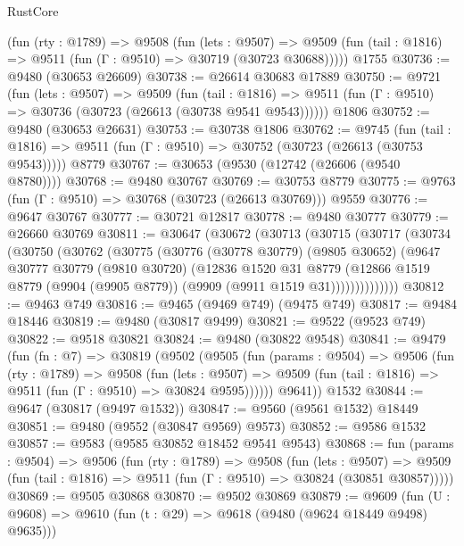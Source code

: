 \begin{lexlean}{RustCore}
\begin{coremodule}
    (fun (rty : @1789) =>
    @9508
      (fun (lets : @9507) =>
      @9509 (fun (tail : @1816) => @9511 (fun (Γ : @9510) => @30719 (@30723 @30688)))))
    @1755
@30736 := @9480 (@30653 @26609)
@30738 := @26614 @30683 @17889
@30750 := @9721
    (fun (lets : @9507) =>
    @9509
      (fun (tail : @1816) =>
      @9511 (fun (Γ : @9510) => @30736 (@30723 (@26613 (@30738 @9541 @9543))))))
    @1806
@30752 := @9480 (@30653 @26631)
@30753 := @30738 @1806
@30762 := @9745
    (fun (tail : @1816) => @9511 (fun (Γ : @9510) => @30752 (@30723 (@26613 (@30753 @9543)))))
    @8779
@30767 := @30653 (@9530 (@12742 (@26606 (@9540 @8780))))
@30768 := @9480 @30767
@30769 := @30753 @8779
@30775 := @9763 (fun (Γ : @9510) => @30768 (@30723 (@26613 @30769))) @9559
@30776 := @9647 @30767
@30777 := @30721 @12817
@30778 := @9480 @30777
@30779 := @26660 @30769
@30811 := @30647
    (@30672
      (@30713
        (@30715
          (@30717
            (@30734
              (@30750
                (@30762
                  (@30775
                    (@30776
                      (@30778 @30779)
                      (@9805 @30652)
                      (@9647
                        @30777
                        @30779
                        (@9810 @30720)
                        (@12836
                          @1520
                          @31
                          @8779
                          (@12866
                            @1519
                            @8779
                            (@9904 (@9905 @8779))
                            (@9909 (@9911 @1519 @31))))))))))))))
@30812 := @9463 @749
@30816 := @9465 (@9469 @749) (@9475 @749)
@30817 := @9484 @18446
@30819 := @9480 (@30817 @9499)
@30821 := @9522 (@9523 @749)
@30822 := @9518 @30821
@30824 := @9480 (@30822 @9548)
@30841 := @9479
    (fun (fn : @7) =>
    @30819
      (@9502
        (@9505
          (fun (params : @9504) =>
          @9506
            (fun (rty : @1789) =>
            @9508
              (fun (lets : @9507) =>
              @9509 (fun (tail : @1816) => @9511 (fun (Γ : @9510) => @30824 @9595))))))
        @9641))
    @1532
@30844 := @9647 (@30817 (@9497 @1532))
@30847 := @9560 (@9561 @1532) @18449
@30851 := @9480 (@9552 (@30847 @9569) @9573)
@30852 := @9586 @1532
@30857 := @9583 (@9585 @30852 @18452 @9541 @9543)
@30868 := fun (params : @9504) =>
  @9506
    (fun (rty : @1789) =>
    @9508
      (fun (lets : @9507) =>
      @9509 (fun (tail : @1816) => @9511 (fun (Γ : @9510) => @30824 (@30851 @30857)))))
@30869 := @9505 @30868
@30870 := @9502 @30869
@30879 := @9609
    (fun (U : @9608) => @9610 (fun (t : @29) => @9618 (@9480 (@9624 @18449 @9498) @9635)))

\end{coremodule}
\end{lexlean}
